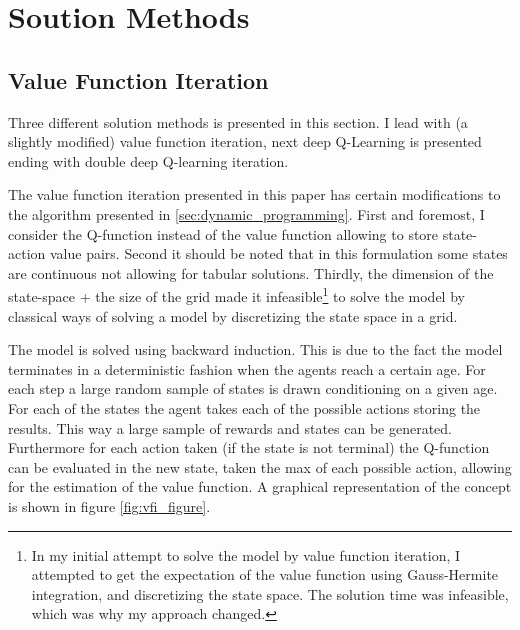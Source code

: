 \section{Soution Methods}\label{sec:solution_methods}

\subsection{Value Function Iteration}

Three different solution methods is presented in this section. I lead with (a slightly modified) value function iteration, next deep Q-Learning is presented ending with double deep Q-learning iteration.

The value function iteration presented in this paper has certain modifications to the algorithm presented in \ref{sec:dynamic_programming}. First and foremost, I consider the Q-function instead of the value function allowing to store state-action value pairs. Second it should be noted that in this formulation some states are continuous not allowing for tabular solutions. Thirdly, the dimension of the state-space + the size of the grid made it infeasible\footnote{In my initial attempt to solve the model by value function iteration, I attempted to get the expectation of the value function using Gauss-Hermite integration, and discretizing the state space. The solution time was infeasible, which was why my approach changed.} to solve the model by classical ways of solving a model by discretizing the state space in a grid. 

The model is solved using backward induction. This is due to the fact the model terminates in a deterministic fashion when the agents reach a certain age. For each step a large random sample of states is drawn conditioning on a given age. For each of the states the agent takes each of the possible actions storing the results. This way a large sample of rewards and states can be generated. Furthermore for each action taken (if the state is not terminal) the  Q-function can be evaluated in the new state, taken the max of each possible action, allowing for the estimation of the value function. A graphical representation of the concept is shown in figure \ref{fig:vfi_figure}. 


